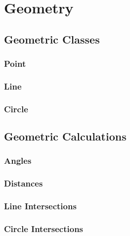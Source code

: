 \chapter{Geometry}

%

\section{Geometric Classes}
\setcounter{section}{1}
\setcounter{subsection}{0}
\subsection{Point}

\subsection{Line}

\subsection{Circle}


\section{Geometric Calculations}
\setcounter{section}{2}
\setcounter{subsection}{0}
\subsection{Angles}

\subsection{Distances}

\subsection{Line Intersections}

\subsection{Circle Intersections}



